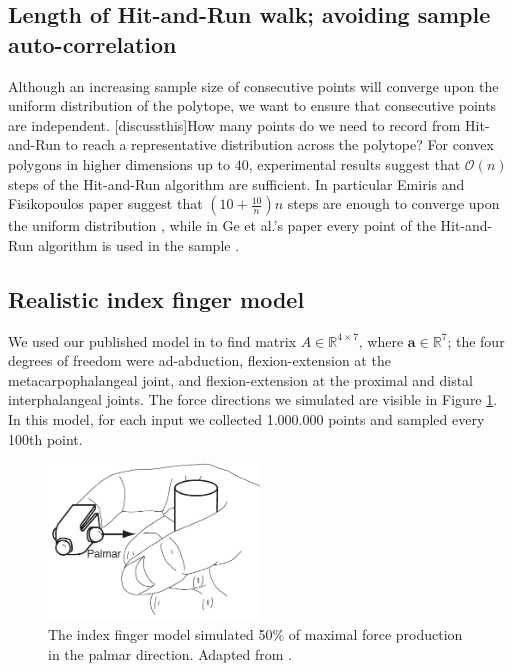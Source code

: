 \subsection{Length of Hit-and-Run walk; avoiding sample auto-correlation}
\label{sec_lengthrun}
Although an increasing sample size of consecutive points will converge upon the uniform distribution of the polytope, we want to ensure that consecutive points are independent. [discussthis]How many points do we need to record from Hit-and-Run to reach a representative distribution across the polytope? For convex polygons in higher dimensions up to $40$, experimental results suggest that $\mathcal{O}(n)$ steps of the Hit-and-Run algorithm are sufficient.
In particular Emiris and Fisikopoulos paper suggest that $(10 + \frac{10}{n})n$ steps are enough to converge upon the uniform distribution \cite{emiris2013efficient}, while in Ge et al.'s paper every point of the Hit-and-Run algorithm is used in the sample \cite{Ge}. 


\subsection{Realistic index finger model}
\label{ss:finger}
We used our published model in \cite{Valero-Cuevas1998Large} to find matrix $A \in \mathbb{R}^{4 \times 7}$, where $\textbf{a} \in \mathbb{R}^7$; the four degrees of freedom were ad-abduction, flexion-extension at the metacarpophalangeal joint, and flexion-extension at the proximal and distal interphalangeal joints.
The force directions we simulated are visible in Figure \ref{fig:finger}. In this model, for each input we collected 1.000.000 points and sampled every 100th point.

\begin{figure}[htbp]
  \centering
  \includegraphics[width=0.5\textwidth]{sections/figs/finger.pdf}
  \caption{The index finger model simulated 50\% of maximal force production in the palmar direction. Adapted from \cite{Valero-Cuevas1998Large}.}
  \label{fig:finger}
\end{figure}



